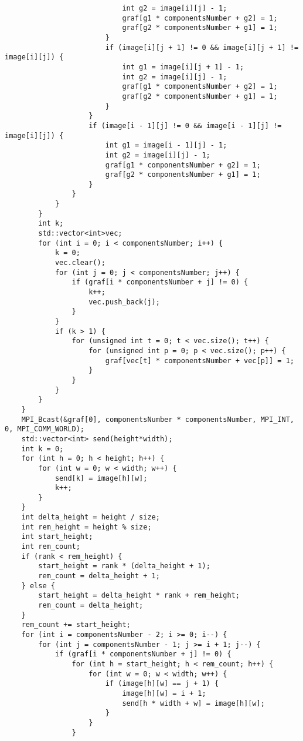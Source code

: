 \documentclass{report}
\begin{document}
\begin{lstlisting}
                            int g2 = image[i][j] - 1;
                            graf[g1 * componentsNumber + g2] = 1;
                            graf[g2 * componentsNumber + g1] = 1;
                        }
                        if (image[i][j + 1] != 0 && image[i][j + 1] != image[i][j]) {
                            int g1 = image[i][j + 1] - 1;
                            int g2 = image[i][j] - 1;
                            graf[g1 * componentsNumber + g2] = 1;
                            graf[g2 * componentsNumber + g1] = 1;
                        }
                    }
                    if (image[i - 1][j] != 0 && image[i - 1][j] != image[i][j]) {
                        int g1 = image[i - 1][j] - 1;
                        int g2 = image[i][j] - 1;
                        graf[g1 * componentsNumber + g2] = 1;
                        graf[g2 * componentsNumber + g1] = 1;
                    }
                }
            }
        }
        int k;
        std::vector<int>vec;
        for (int i = 0; i < componentsNumber; i++) {
            k = 0;
            vec.clear();
            for (int j = 0; j < componentsNumber; j++) {
                if (graf[i * componentsNumber + j] != 0) {
                    k++;
                    vec.push_back(j);
                }
            }
            if (k > 1) {
                for (unsigned int t = 0; t < vec.size(); t++) {
                    for (unsigned int p = 0; p < vec.size(); p++) {
                        graf[vec[t] * componentsNumber + vec[p]] = 1;
                    }
                }
            }
        }
    }
    MPI_Bcast(&graf[0], componentsNumber * componentsNumber, MPI_INT, 0, MPI_COMM_WORLD);
    std::vector<int> send(height*width);
    int k = 0;
    for (int h = 0; h < height; h++) {
        for (int w = 0; w < width; w++) {
            send[k] = image[h][w];
            k++;
        }
    }
    int delta_height = height / size;
    int rem_height = height % size;
    int start_height;
    int rem_count;
    if (rank < rem_height) {
        start_height = rank * (delta_height + 1);
        rem_count = delta_height + 1;
    } else {
        start_height = delta_height * rank + rem_height;
        rem_count = delta_height;
    }
    rem_count += start_height;
    for (int i = componentsNumber - 2; i >= 0; i--) {
        for (int j = componentsNumber - 1; j >= i + 1; j--) {
            if (graf[i * componentsNumber + j] != 0) {
                for (int h = start_height; h < rem_count; h++) {
                    for (int w = 0; w < width; w++) {
                        if (image[h][w] == j + 1) {
                            image[h][w] = i + 1;
                            send[h * width + w] = image[h][w];
                        }
                    }
                }


\end{lstlisting}
\end{document}
